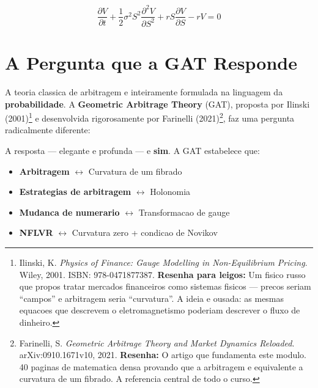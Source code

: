 \[
\frac{\partial V}{\partial t} + \frac{1}{2}\sigma^2 S^2
\frac{\partial^2 V}{\partial S^2} + rS\frac{\partial V}{\partial S} - rV = 0
\]

\section{A Pergunta que a GAT Responde}

A teoria classica de arbitragem e inteiramente formulada na linguagem da
\textbf{probabilidade}. A \textbf{Geometric Arbitrage Theory} (GAT),
proposta por Ilinski (2001)\footnote{Ilinski, K. \textit{Physics of Finance:
Gauge Modelling in Non-Equilibrium Pricing}. Wiley, 2001. ISBN:
978-0471877387. \textbf{Resenha para leigos:} Um fisico russo que propos
tratar mercados financeiros como sistemas fisicos --- precos seriam
``campos'' e arbitragem seria ``curvatura''. A ideia e ousada: as mesmas
equacoes que descrevem o eletromagnetismo poderiam descrever o fluxo de
dinheiro.} e desenvolvida rigorosamente por Farinelli (2021)\footnote{
Farinelli, S. \textit{Geometric Arbitrage Theory and Market Dynamics
Reloaded}. arXiv:0910.1671v10, 2021. \textbf{Resenha:} O artigo que
fundamenta este modulo. 40 paginas de matematica densa provando que a
arbitragem e equivalente a curvatura de um fibrado. A referencia central
de todo o curso.}, faz uma pergunta radicalmente diferente:

\begin{center}
\end{center}

A resposta --- elegante e profunda --- e \textbf{sim}. A GAT estabelece
que:

\begin{itemize}[nosep]
  \item \textbf{Arbitragem} $\longleftrightarrow$ Curvatura de um fibrado
  \item \textbf{Estrategias de arbitragem} $\longleftrightarrow$ Holonomia
  \item \textbf{Mudanca de numerario} $\longleftrightarrow$ Transformacao
        de gauge
  \item \textbf{NFLVR} $\longleftrightarrow$ Curvatura zero + condicao de
        Novikov
\end{itemize}

